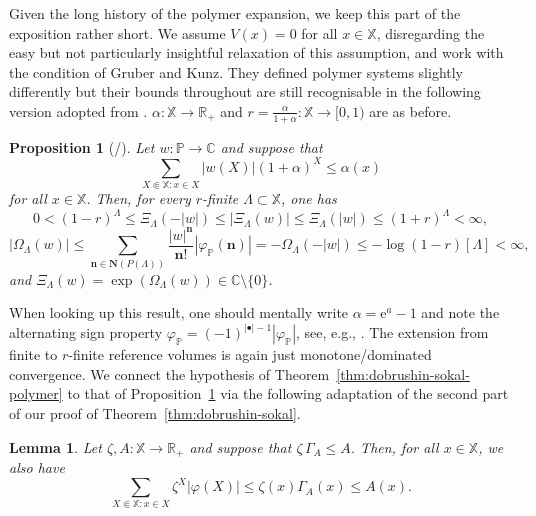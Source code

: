 \documentclass[reqno, 11pt]{amsart}
\newtheorem{lemma}[theorem]{Lemma}
\newtheorem{prop}[theorem]{Proposition}
\theoremstyle{definition}
\newcommand{\e}{\mathrm{e}}
\newcommand{\R}{\mathbb{R}}
\newcommand{\C}{\mathbb{C}}
\renewcommand{\P}{\mathbb{P}}
\newcommand{\X}{\mathbb X}
\begin{document}
Given the long history of the polymer expansion, we keep this part of the exposition rather short. 
We assume $V(x) = 0$ for all $x \in \X$, disregarding the easy but not particularly insightful relaxation of this assumption, and work with the condition of Gruber and Kunz. 
They defined polymer systems slightly differently but their bounds throughout \cite[Subsection~4.2]{ref:gruber-kunz} are still recognisable in the following version adopted from \cite{ref:fernandez-procacci, ref:bissacot-fernandez-procacci, ref:jansen-kolesnikov}. 
$\alpha : \X \to \R_+$ and $r = \frac{\alpha}{1+\alpha} : \X \to [0, 1)$ are as before.

\begin{prop}[{\cite[Theorem~2.4]{ref:bissacot-fernandez-procacci}/\cite[Corollary~2.8]{ref:jansen-kolesnikov}}] \label{prop:gruber-kunz}
	Let $w : \P \to \C$ and suppose that
	\[
		\sum_{X \Subset \X : x \in X} |w(X)| (1 + \alpha)^X \leq \alpha(x)
	\]
	for all $x \in \X$. 
	Then, for every $r$-finite $\Lambda \subset \X$, one has
	\[
		0 < (1-r)^\Lambda \leq \Xi_\Lambda(-|w|) \leq |\Xi_\Lambda(w)| \leq \Xi_\Lambda(|w|) \leq (1+r)^\Lambda < \infty,
	\]
	\[
		|\Omega_\Lambda(w)| \leq \sum_{\mathbf n \in \mathbf N(P(\Lambda))} \frac{|w|^\mathbf n}{\mathbf n!} |\varphi_\P(\mathbf n)| = - \Omega_\Lambda(-|w|) \leq - \log (1 - r)[\Lambda] < \infty,
	\]
	and $\Xi_\Lambda(w) = \exp(\Omega_\Lambda(w)) \in \C \setminus \{0\}$.
\end{prop}

When looking up this result, one should mentally write $\alpha = \e^a - 1$ and note the alternating sign property $\varphi_\P = (-1)^{|\bullet|-1} |\varphi_\P|$, see, e.g., \cite{ref:scott-sokal, ref:fernandez-procacci, ref:bissacot-fernandez-procacci, ref:jansen-kolesnikov}. 
The extension from finite to $r$-finite reference volumes is again just monotone/dominated convergence. 
We connect the hypothesis of Theorem~\ref{thm:dobrushin-sokal-polymer} to that of Proposition~\ref{prop:gruber-kunz} via the following adaptation of the second part of our proof of Theorem~\ref{thm:dobrushin-sokal}.

\begin{lemma} \label{lem:dobrushin-sokal-subsets}
	Let $\zeta, A : \X \to \R_+$ and suppose that $\zeta \, \Gamma_A \leq A$. 
	Then, for all $x \in \X$, we also have
	\[
		\sum_{X \Subset \X : x \in X} \zeta^X |\varphi(X)| \leq \zeta(x) \Gamma_A(x) \leq A(x).
	\]
\end{lemma}
\end{document}
